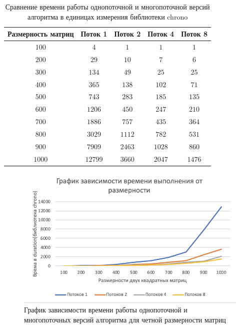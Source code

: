 \documentclass[12pt, a4paper]{report}
\begin{document}
	\begin{table}[ht!]
		\caption{Сравнение времени работы однопоточной и многопоточной версий алгоритма в единицах измерения библиотеки chrono}
		\label{table1}
		\begin{center}
			\begin{tabular}{|c|c|c|c|c|}
				\hline
				\bf{Размерность матриц} & \bf{Поток 1} & \bf{Поток 2} & \bf{Поток 4} & \bf{Поток 8}\\\hline
				
				$100$ & $4$ & $1$ & $1$ & $1$\\\hline
				
				$200$ & $29$ & $10$ & $7$ & $6$\\\hline
				
				$300$ & $134$ & $49$ & $25$ & $25$\\\hline
				
				$400$ & $365$ & $138$ & $102$ & $71$\\\hline
				
				$500$ & $743$ & $283$ & $185$ & $135$\\\hline
				
				$600$ & $1206$ & $450$ & $247$ & $210$\\\hline
				
				$700$ & $1886$ & $757$ & $435$ & $364$\\\hline
				
				$800$ & $3029$ & $1112$ & $782$ & $531$\\\hline
				
				$900$ & $7909$ & $2463$ & $1028$ & $860$\\\hline
				
				$1000$ & $12799$ & $3660$ & $2047$ & $1476$\\\hline
			\end{tabular}
		\end{center}
	\end{table}

	\newpage

	\begin{figure}[ht!]
		\label{pic1}
		\includegraphics[scale=1.2]{table2}
		\caption{График зависимости времени работы однопоточной и многопоточных версий 	алгоритма для четной размерности матриц}
		\label{fig:image}
	\end{figure}
\end{document}
